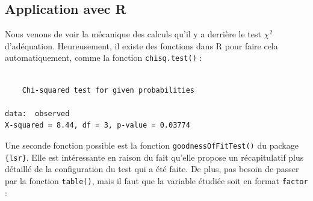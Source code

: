 \documentclass[
  letterpaper,
]{book}
\newenvironment{Shaded}{\begin{snugshade}}{\end{snugshade}}
\newcommand{\AttributeTok}[1]{\textcolor[rgb]{0.40,0.45,0.13}{#1}}
\newcommand{\FloatTok}[1]{\textcolor[rgb]{0.68,0.00,0.00}{#1}}
\newcommand{\FunctionTok}[1]{\textcolor[rgb]{0.28,0.35,0.67}{#1}}
\newcommand{\NormalTok}[1]{\textcolor[rgb]{0.00,0.23,0.31}{#1}}
\newcommand{\OtherTok}[1]{\textcolor[rgb]{0.00,0.23,0.31}{#1}}
\newcommand{\SpecialCharTok}[1]{\textcolor[rgb]{0.37,0.37,0.37}{#1}}
\begin{document}
\subsection{Application avec R}\label{application-avec-r}

Nous venons de voir la mécanique des calculs qu'il y a derrière le test
\(\chi^2\) d'adéquation. Heureusement, il existe des fonctions dans R
pour faire cela automatiquement, comme la fonction \texttt{chisq.test()}
:

\begin{Shaded}
\end{Shaded}

\begin{verbatim}

    Chi-squared test for given probabilities

data:  observed
X-squared = 8.44, df = 3, p-value = 0.03774
\end{verbatim}

Une seconde fonction possible est la fonction
\texttt{goodnessOfFitTest()} du package \texttt{\{lsr\}}. Elle est
intéressante en raison du fait qu'elle propose un récapitulatif plus
détaillé de la configuration du test qui a été faite. De plus, pas
besoin de passer par la fonction \texttt{table()}, mais il faut que la
variable étudiée soit en format \texttt{factor} :

\begin{Shaded}
\end{Shaded}
\end{document}

